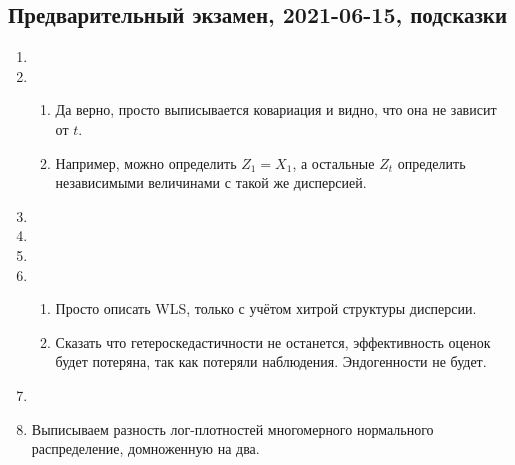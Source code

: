 \subsection{Предварительный экзамен, 2021-06-15, подсказки}

\begin{enumerate}
\item
\item 
\begin{enumerate}
    \item Да верно, просто выписывается ковариация и видно, что она не зависит от $t$.
    \item Например, можно определить $Z_1 = X_1$, а остальные $Z_t$ определить независимыми величинами с такой же дисперсией.
\end{enumerate}
\item
\item

\item
\item \begin{enumerate}
    \item Просто описать WLS, только с учётом хитрой структуры дисперсии.
    \item Сказать что гетероскедастичности не останется, эффективность оценок будет потеряна, так как потеряли наблюдения. Эндогенности не будет.
\end{enumerate}
\item
\item Выписываем разность лог-плотностей многомерного нормального распределение, домноженную на два.
\end{enumerate}
